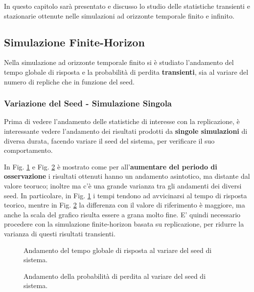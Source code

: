 \documentclass{article}
\begin{document}
In questo capitolo sarà presentato e discusso lo studio delle statistiche transienti e stazionarie ottenute nelle simulazioni ad orizzonte temporale finito e infinito.

\subsection{Simulazione Finite-Horizon}

Nella simulazione ad orizzonte temporale finito si è studiato l'andamento del tempo globale di risposta e la probabilità di perdita \textbf{transienti}, sia al variare del numero di repliche che in funzione del seed.

\subsubsection{Variazione del Seed - Simulazione Singola}

Prima di vedere l'andamento delle statistiche di interesse con la replicazione, è interessante vedere l'andamento dei risultati prodotti da \textbf{singole simulazioni} di diversa durata, facendo variare il seed del sistema, per verificare il suo comportamento.

In Fig. \ref{fig:grt_seed_finite} e Fig. \ref{fig:ploss_seed_finite} è mostrato come per all'\textbf{aumentare del periodo di osservazione} i risultati ottenuti hanno un andamento asintotico, ma distante dal valore teoruco; inoltre ma c'è una grande varianza tra gli andamenti dei diversi seed. In particolare, in Fig. \ref{fig:grt_seed_finite} i tempi tendono ad avvicinarsi al tempo di risposta teorico, mentre in Fig. \ref{fig:ploss_seed_finite} la differenza con il valore di riferimento è maggiore, ma anche la scala del grafico risulta essere a grana molto fine. E' quindi necessario procedere con la simulazione finite-horizon basata su replicazione, per ridurre la varianza di questi risultati transienti.

\begin{figure}[htbp]
  \centering
  
  \caption{Andamento del tempo globale di risposta al variare del seed di sistema.}
  \label{fig:grt_seed_finite}
\end{figure}

\begin{figure}[htbp]
  \centering
  
  \caption{Andamento della probabilità di perdita al variare del seed di sistema.}
  \label{fig:ploss_seed_finite}
\end{figure}
\FloatBarrier
\end{document}
